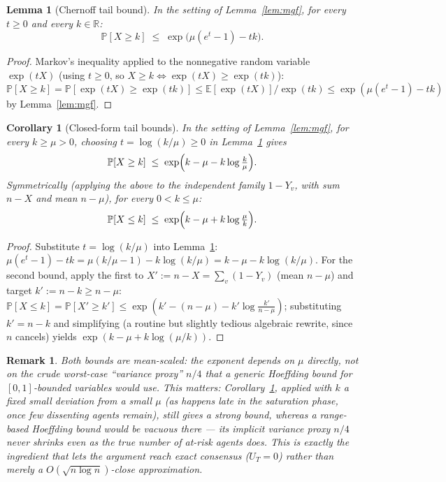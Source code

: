 \documentclass[11pt]{article}
\newtheorem{lemma}[theorem]{Lemma}
\newtheorem{corollary}[theorem]{Corollary}
\newtheorem{remark}[theorem]{Remark}
\newcommand{\E}{\mathbb{E}}
\renewcommand{\Pr}{\mathbb{P}}
\newcommand{\R}{\mathbb{R}}
\begin{document}
\begin{lemma}[Chernoff tail bound]\label{lem:chernoff}
In the setting of Lemma~\ref{lem:mgf}, for every $t \ge 0$ and every $k \in
\R$:
\[
  \Pr[X \ge k] \;\le\; \exp\bigl(\mu(e^t-1) - tk\bigr).
\]
\end{lemma}
\begin{proof}
Markov's inequality applied to the nonnegative random variable
$\exp(tX)$ (using $t\ge0$, so $X\ge k \iff \exp(tX)\ge\exp(tk)$):
$\Pr[X\ge k] = \Pr[\exp(tX) \ge \exp(tk)] \le \E[\exp(tX)]/\exp(tk) \le
\exp(\mu(e^t-1) - tk)$ by Lemma~\ref{lem:mgf}.
\end{proof}

\begin{corollary}[Closed-form tail bounds]\label{cor:chernofftail}
In the setting of Lemma~\ref{lem:mgf}, for every $k \ge \mu > 0$, choosing
$t = \log(k/\mu) \ge 0$ in Lemma~\ref{lem:chernoff} gives
\[
  \Pr[X \ge k] \;\le\; \exp\Bigl(k - \mu - k\log\tfrac{k}\mu\Bigr).
\]
Symmetrically (applying the above to the independent family $1-Y_v$, with
sum $n-X$ and mean $n-\mu$), for every $0 < k \le \mu$:
\[
  \Pr[X \le k] \;\le\; \exp\Bigl(k - \mu + k\log\tfrac\mu{k}\Bigr).
\]
\end{corollary}
\begin{proof}
Substitute $t=\log(k/\mu)$ into Lemma~\ref{lem:chernoff}: $\mu(e^t-1)-tk =
\mu(k/\mu - 1) - k\log(k/\mu) = k - \mu - k\log(k/\mu)$. For the second
bound, apply the first to $X' := n - X = \sum_v(1-Y_v)$ (mean $n-\mu$) and
target $k' := n-k \ge n-\mu$: $\Pr[X\le k] = \Pr[X'\ge k'] \le \exp(k' -
(n-\mu) - k'\log\frac{k'}{n-\mu})$; substituting $k'=n-k$ and simplifying
(a routine but slightly tedious algebraic rewrite, since $n$ cancels)
yields $\exp(k-\mu+k\log(\mu/k))$.
\end{proof}

\begin{remark}
Both bounds are \emph{mean-scaled}: the exponent depends on $\mu$ directly,
not on the crude worst-case ``variance proxy'' $n/4$ that a generic
Hoeffding bound for $[0,1]$-bounded variables would use. This matters:
Corollary~\ref{cor:chernofftail}, applied with $k$ a fixed small deviation
from a \emph{small} $\mu$ (as happens late in the saturation phase, once
few dissenting agents remain), still gives a strong bound, whereas a
range-based Hoeffding bound would be vacuous there — its implicit variance
proxy $n/4$ never shrinks even as the true number of at-risk agents does.
This is exactly the ingredient that lets the argument reach \emph{exact}
consensus ($U_T=0$) rather than merely a $O(\sqrt{n\log n})$-close
approximation.
\end{remark}
\end{document}
